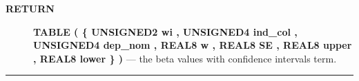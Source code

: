 \par
\begin{description}
\item [\colorbox{tagtype}{\color{white} \textbf{\textsf{RETURN}}}] \textbf{TABLE ( \{ UNSIGNED2 wi , UNSIGNED4 ind\_col , UNSIGNED4 dep\_nom , REAL8 w , REAL8 SE , REAL8 upper , REAL8 lower \} )} --- the beta values with confidence intervals term.
\end{description}




\rule{\linewidth}{0.5pt}
